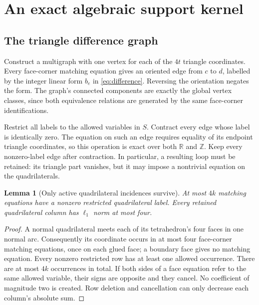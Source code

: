 \documentclass[11pt]{article}
\newtheorem{lemma}[theorem]{Lemma}
\theoremstyle{definition}
\theoremstyle{remark}
\newcommand{\R}{\mathbb R}
\newcommand{\Z}{\mathbb Z}
\begin{document}
\section{An exact algebraic support kernel}
\label{sec:kernel}

\subsection{The triangle difference graph}

Construct a multigraph with one vertex for each of the $4t$ triangle
coordinates. Every face-corner matching equation gives an oriented edge from
$c$ to $d$, labelled by the integer linear form $b_e$ in
\eqref{eq:difference}. Reversing the orientation negates the form. The graph's
connected components are exactly the global vertex classes, since both
equivalence relations are generated by the same face-corner identifications.

Restrict all labels to the allowed variables in $S$. Contract every edge whose
label is identically zero. The equation on such an edge requires equality of
its endpoint triangle coordinates, so this operation is exact over both
$\R$ and $\Z$. Keep every nonzero-label edge after contraction. In particular,
a resulting loop must be retained: its triangle part vanishes, but it may
impose a nontrivial equation on the quadrilaterals.

\begin{lemma}[Only active quadrilateral incidences survive]
\label{lem:edges}
At most $4k$ matching equations have a nonzero restricted quadrilateral label.
Every retained quadrilateral column has $\ell_1$ norm at most four.
\end{lemma}
\begin{proof}
A normal quadrilateral meets each of its tetrahedron's four faces in one
normal arc. Consequently its coordinate occurs in at most four face-corner
matching equations, once on each glued face; a boundary face gives no matching
equation. Every nonzero restricted row has at least one allowed occurrence.
There are at most $4k$ occurrences in total. If both sides of a face equation
refer to the same allowed variable, their signs are opposite and they cancel.
No coefficient of magnitude two is created. Row deletion and cancellation
can only decrease each column's absolute sum.
\end{proof}
\end{document}
